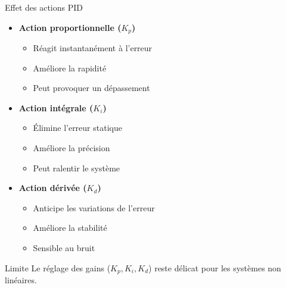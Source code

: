 \documentclass[aspectratio=169,12pt]{beamer}
\begin{document}
	\begin{frame}{\color{red}Effet des actions PID}
		
		\begin{itemize}
			\item \textbf{Action proportionnelle ($K_p$)}
			\begin{itemize}
				\item Réagit instantanément à l’erreur
				\item Améliore la rapidité
				\item Peut provoquer un dépassement
			\end{itemize}
			
			\vspace{4pt}
			
			\item \textbf{Action intégrale ($K_i$)}
			\begin{itemize}
				\item Élimine l’erreur statique
				\item Améliore la précision
				\item Peut ralentir le système
			\end{itemize}
			
			\vspace{3pt}
			
			\item \textbf{Action dérivée ($K_d$)}
			\begin{itemize}
				\item Anticipe les variations de l’erreur
				\item Améliore la stabilité
				\item Sensible au bruit
			\end{itemize}
			
		\end{itemize}
		
		\vspace{3pt}
		
		\begin{alertblock}{Limite}
			Le réglage des gains ($K_p, K_i, K_d$) reste délicat pour les systèmes non linéaires.
		\end{alertblock}
		
	\end{frame}
\end{document}
